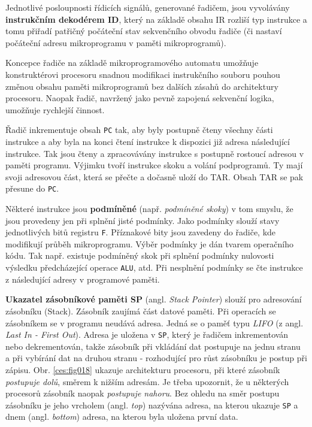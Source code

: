     Jednotlivé posloupnosti řídicích signálů, generované řadičem, jsou vyvolávány 
    \textbf{instrukčním dekodérem ID}, který na základě obsahu IR rozliší typ instrukce a tomu 
    přiřadí patřičný počáteční stav sekvenčního obvodu řadiče (či nastaví počáteční adresu 
    mikroprogramu v paměti mikroprogramů).    
    
    
    \begin{mdframed}[style=mdnote]
      Koncepce řadiče na základě mikroprogramového automatu umožňuje konstruktérovi procesoru 
      snadnou modifikaci instrukčního souboru pouhou změnou obsahu paměti mikroprogramů bez dalších 
      zásahů do architektury procesoru. Naopak řadič, navržený jako pevně zapojená sekvenční 
      logika, umožňuje rychlejší činnost.
    \end{mdframed}
    
    Řadič inkrementuje obsah \texttt{PC} tak, aby byly postupně čteny všechny části instrukce a aby 
    byla na konci čtení instrukce k dispozici již adresa následující instrukce. Tak jsou čteny a 
    zpracovávány instrukce s postupně rostoucí adresou v paměti programu. Výjimku tvoří instrukce 
    skoku a volání podprogramů. Ty mají svoji adresovou část, která se přečte a dočasně uloží do 
    TAR. Obsah TAR se pak přesune do \texttt{PC}.
    
    Některé instrukce jsou \textbf{podmíněné} (např. \emph{podmíněné skoky}) v tom smyslu, že jsou 
    provedeny jen při splnění jisté podmínky. Jako podmínky slouží stavy jednotlivých bitů registru 
    \texttt{F}. Příznakové bity jsou zavedeny do řadiče, kde modifikují průběh mikroprogramu. Výběr 
    podmínky je dán tvarem operačního kódu. Tak např. existuje podmíněný skok při splnění 
    podmínky nulovosti výsledku předcházející operace \texttt{ALU}, atd. Při nesplnění podmínky se 
    čte instrukce z následující adresy v programové paměti.
     
    \textbf{Ukazatel zásobníkové paměti SP} (angl. \emph{Stack Pointer}) slouží pro adresování 
    zásobníku (Stack). Zásobník zaujímá část datové paměti. Při operacích se zásobníkem se v 
    programu neudává adresa. Jedná se o paměť typu \emph{LIFO} (z angl. \emph{Last In - First 
    Out}). Adresa je uložena v \texttt{SP}, který je řadičem inkrementován nebo dekrementován, 
    takže zásobník při vkládání dat postupuje na jednu stranu a při vybírání dat na druhou stranu - 
    rozhodující pro růst zásobníku je postup při zápisu. Obr. \ref{ces:fig018} ukazuje 
    architekturu procesoru, při které zásobník \emph{postupuje dolů}, směrem k nižším adresám. Je 
    třeba upozornit, že u některých procesorů zásobník naopak \emph{postupuje nahoru}. Bez 
    ohledu na směr postupu zásobníku je jeho vrcholem (angl. \emph{top}) nazývána adresa, na kterou 
    ukazuje \texttt{SP} a dnem (angl. \emph{bottom}) adresa, na kterou byla uložena první data.
    

